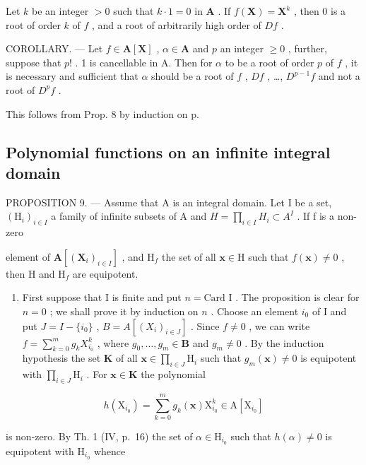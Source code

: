Let \(k\) be an integer \(> 0\) such that \(k \cdot 1 = 0\) in \(\mathbf{A}\) . If \(f(\mathbf{X}) = \mathbf{X}^k\) , then \(0\) is a root of order \(k\) of \(f\) , and a root of arbitrarily high order of \(Df\) .

COROLLARY. --- Let \(f \in \mathbf{A}[\mathbf{X}]\) , \(\alpha \in \mathbf{A}\) and \(p\) an integer \(\geqslant 0\) , further, suppose that \(p!\) . 1 is cancellable in A. Then for \(\alpha\) to be a root of order \(p\) of \(f\) , it is necessary and sufficient that \(\alpha\) should be a root of \(f\) , \(Df\) , \ldots, \(D^{p-1}f\) and not a root of \(D^p f\) .

This follows from Prop. 8 by induction on p.

\subsection{Polynomial functions on an infinite integral domain}

PROPOSITION 9. --- Assume that A is an integral domain. Let I be a set, \((\mathrm{H}_{i})_{i\in I}\) a family of infinite subsets of A and \(H=\prod_{i\in I}H_{i}\subset A^{I}\) . If f is a non-zero

element of \(\mathbf{A}[(\mathbf{X}_i)_{i\in I}]\) , and \(\mathrm{H}_f\) the set of all \(\mathbf{x}\in \mathrm{H}\) such that \(f(\mathbf{x})\neq 0\) , then \(\mathrm{H}\) and \(\mathrm{H}_f\) are equipotent.

\begin{enumerate}
\def\labelenumi{\alph{enumi})}
\tightlist
\item
  First suppose that I is finite and put \(n = \text{Card I}\) . The proposition is clear for \(n = 0\) ; we shall prove it by induction on \(n\) . Choose an element \(i_0\) of I and put \(J = I - \{i_0\}\) , \(B = A[(X_i)_{i \in J}]\) . Since \(f \neq 0\) , we can write \(f = \sum_{k=0}^{m} g_k X_{i_0}^k\) , where \(g_0, \ldots, g_m \in \mathbf{B}\) and \(g_m \neq 0\) . By the induction hypothesis the set \(\mathbf{K}\) of all \(\mathbf{x} \in \prod_{i \in J} \mathrm{H}_i\) such that \(g_m(\mathbf{x}) \neq 0\) is equipotent with \(\prod_{i \in J} \mathrm{H}_i\) . For \(\mathbf{x} \in \mathbf{K}\) the polynomial
\end{enumerate}

\[
h \left(\mathrm{X} _ {i _ {0}}\right) = \sum_ {k = 0} ^ {m} g _ {k} (\mathbf {x}) \mathrm{X} _ {i _ {0}} ^ {k} \in \mathrm{A} \left[ \mathrm{X} _ {i _ {0}} \right]
\]

is non-zero. By Th. 1 (IV, p.~16) the set of \(\alpha \in \mathrm{H}_{i_0}\) such that \(h(\alpha) \neq 0\) is equipotent with \(\mathrm{H}_{i_0}\) whence

